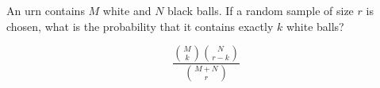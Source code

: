\item An urn contains $M$ white and $N$ black balls. If a random sample of size $r$ is chosen, what is the probability that it contains exactly $k$ white balls?

\[ \frac{\binom{M}{k} \binom{N}{r-k}}{\binom{M+N}{r}} \]